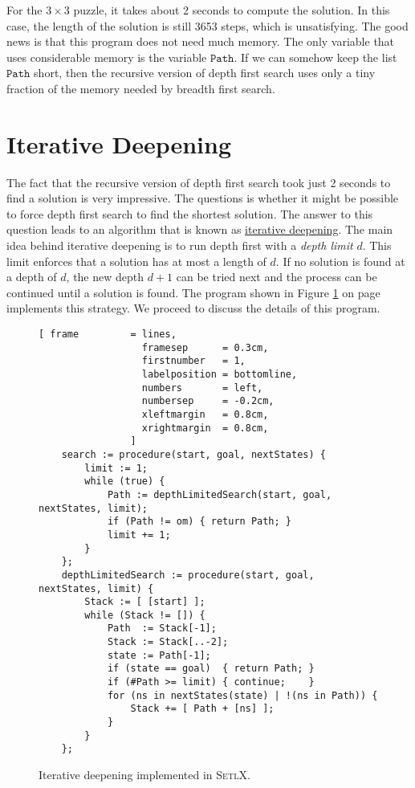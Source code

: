 For the $3 \times 3$ puzzle, it takes about 2 seconds to compute the solution.  In this case, the length of
the solution is still 3653 steps, which is unsatisfying.  The good news is that this program does not
need much memory.  The only variable that uses considerable memory is the variable $\mathtt{Path}$.
If we can somehow keep the list $\mathtt{Path}$ short, then the recursive version of depth first search uses only a
tiny fraction of the memory needed by breadth first search.

\section{Iterative Deepening}
The fact that the recursive version of depth first search took just 2 seconds to find a solution is
very impressive.  The questions is whether it might be possible to force depth first search to find
the shortest solution.  The answer to this question leads to an algorithm that is known as
\href{https://en.wikipedia.org/wiki/Iterative_deepening_depth-first_search}{iterative deepening}.  The main
idea behind iterative deepening is to run depth first with a \emph{\color{blue}depth limit} $d$.  This limit
enforces that a solution has at most a length of $d$.  If no solution is found at a depth of $d$, the new depth
$d+1$ can be tried next and the process can be continued until a solution is found.  The program shown in
Figure \ref{fig:iterative-deepening.stlx} on page \pageref{fig:iterative-deepening.stlx} implements this strategy.
We proceed to discuss the details of this program.

\begin{figure}[!ht]
\centering
\begin{Verbatim}[ frame         = lines, 
                  framesep      = 0.3cm, 
                  firstnumber   = 1,
                  labelposition = bottomline,
                  numbers       = left,
                  numbersep     = -0.2cm,
                  xleftmargin   = 0.8cm,
                  xrightmargin  = 0.8cm,
                ]
    search := procedure(start, goal, nextStates) {
        limit := 1;
        while (true) {
            Path := depthLimitedSearch(start, goal, nextStates, limit);
            if (Path != om) { return Path; }
            limit += 1;
        }
    };
    depthLimitedSearch := procedure(start, goal, nextStates, limit) {
        Stack := [ [start] ];
        while (Stack != []) {
            Path  := Stack[-1];
            Stack := Stack[..-2];
            state := Path[-1];
            if (state == goal)  { return Path; }
            if (#Path >= limit) { continue;    }
            for (ns in nextStates(state) | !(ns in Path)) {  
                Stack += [ Path + [ns] ];
            }
        }
    };
\end{Verbatim}
\vspace*{-0.3cm}
\caption{Iterative deepening implemented in \textsc{SetlX}.}
\label{fig:iterative-deepening.stlx}
\end{figure}


